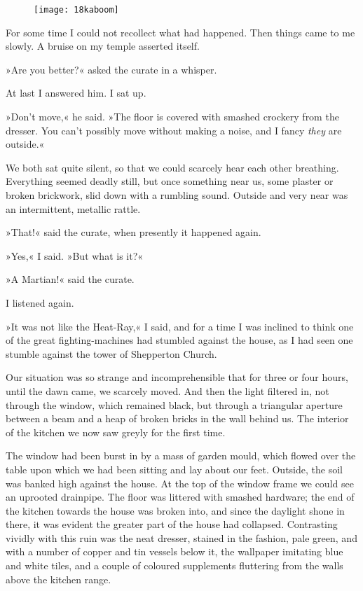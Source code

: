 \begin{figure}[tb!]
\centering
\texttt{[image: 18kaboom]}
\end{figure}

For some time I could not recollect what had happened. Then things came to me slowly. A bruise on my temple asserted itself.

»Are you better?« asked the curate in a whisper.

At last I answered him. I sat up.

»Don't move,« he said. »The floor is covered with smashed crockery from the dresser. You can't possibly move without making a noise, and I fancy \textit{they} are outside.«

We both sat quite silent, so that we could scarcely hear each other breathing. Everything seemed deadly still, but once something near us, some plaster or broken brickwork, slid down with a rumbling sound. Outside and very near was an intermittent, metallic rattle.

»That!« said the curate, when presently it happened again.

»Yes,« I said. »But what is it?«

»A Martian!« said the curate.

I listened again.

»It was not like the Heat-Ray,« I said, and for a time I was inclined to think one of the great fighting-machines had stumbled against the house, as I had seen one stumble against the tower of Shepperton Church.

Our situation was so strange and incomprehensible that for three or four hours, until the dawn came, we scarcely moved. And then the light filtered in, not through the window, which remained black, but through a triangular aperture between a beam and a heap of broken bricks in the wall behind us. The interior of the kitchen we now saw greyly for the first time.

The window had been burst in by a mass of garden mould, which flowed over the table upon which we had been sitting and lay about our feet. Outside, the soil was banked high against the house. At the top of the window frame we could see an uprooted drainpipe. The floor was littered with smashed hardware; the end of the kitchen towards the house was broken into, and since the daylight shone in there, it was evident the greater part of the house had collapsed. Contrasting vividly with this ruin was the neat dresser, stained in the fashion, pale green, and with a number of copper and tin vessels below it, the wallpaper imitating blue and white tiles, and a couple of coloured supplements fluttering from the walls above the kitchen range.


